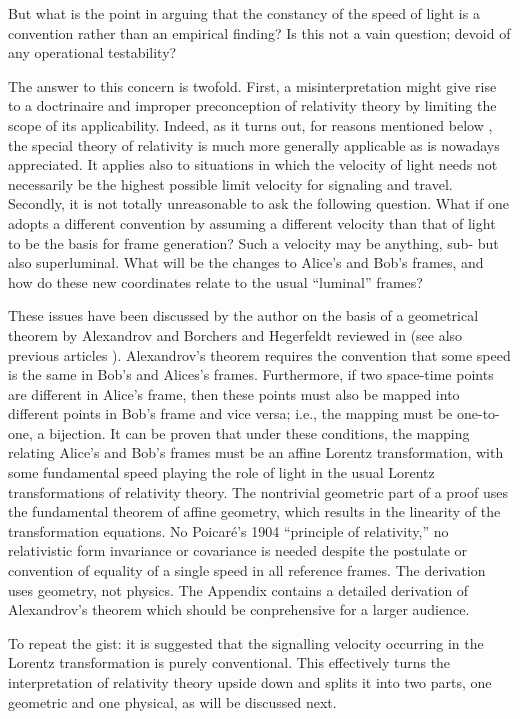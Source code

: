 But what is the point in arguing that the constancy of
the speed of light is a convention rather than an empirical finding?
Is this not a vain question; devoid of any operational testability?

The answer to this concern is twofold.
First, a misinterpretation might give rise to a doctrinaire and improper
preconception
of relativity theory by limiting the scope of its
applicability.
Indeed, as it turns out, for reasons mentioned below
\cite{svozil-relrel},
the special theory
of relativity is much more generally applicable as is nowadays appreciated.
It applies also to situations in which
the velocity of light needs not necessarily
be the highest possible limit velocity for signaling
and travel.
Secondly, it is not totally unreasonable to ask the following question.
What if one adopts a different convention by assuming a different
velocity than that of light to be the basis for frame generation?
Such a velocity may be anything, sub- but also superluminal. What will
be the changes to Alice's and Bob's frames, and how do these new
coordinates relate to the usual ``luminal'' frames?

These issues have been discussed by the author
\cite{svozil-relrel}  on the basis of a geometrical theorem by
Alexandrov \cite{alex1,alex2,alex3,alex-col} and Borchers and Hegerfeldt
\cite{borchers-heger} reviewed in \cite{benz,lester}
(see also previous articles \cite{svo5,svo-86}).
Alexandrov's theorem requires the convention that some speed  is
the same in Bob's and Alices's frames.
Furthermore, if two space-time points are different in Alice's frame,
then these points must also be mapped into different points in Bob's
frame and vice versa; i.e., the mapping must be one-to-one, a bijection.
It can be proven that under these conditions, the mapping relating
Alice's and Bob's
frames must be an affine Lorentz transformation, with some fundamental speed
playing
the role of light in the usual Lorentz transformations of relativity
theory.
The nontrivial geometric part of a proof uses the fundamental theorem of affine
geometry, which results in the linearity of the transformation
equations.
No Poicar\'e's 1904 ``principle of relativity,'' no
relativistic form invariance or covariance is needed despite
the postulate or convention of equality of a single speed in all
reference frames.
The derivation uses geometry, not physics.
The Appendix contains a detailed derivation of Alexandrov's theorem which should be
conprehensive for a larger audience.


To repeat the gist: it is suggested that the signalling velocity
occurring in the Lorentz transformation is purely conventional.
This effectively turns the interpretation of relativity theory upside
down and splits it into two parts, one geometric and one physical, as
will be discussed next.


